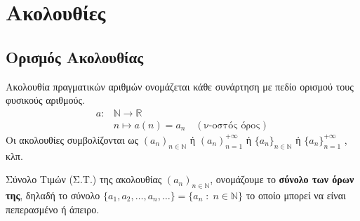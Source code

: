 \documentclass[a4paper,table]{report}
\begin{document}
\chapter{Ακολουθίες}

\section{Ορισμός Ακολουθίας}

\begin{mybox1}
  \begin{dfn}
    \textcolor{Col1}{Ακολουθία} πραγματικών αριθμών ονομάζεται 
    κάθε συνάρτηση με πεδίο ορισμού τους φυσικούς αριθμούς. 
    \begin{align*}
      a \colon &\mathbb{N} \to \mathbb{R} \\
               &n \mapsto a(n)=a_{n} \quad (\text{ν-οστός όρος})
    \end{align*} 
    Οι ακολουθίες συμβολίζονται ως $ (a_{n})_{n \in \mathbb{N}} $ 
    ή $ ( a_{n} ) _{n=1}^{+\infty}$  ή $ \{ a_{n} \} _{n \in \mathbb{N}} $ ή 
    $ \{ a_{n} \} _{n=1}^{+\infty}$ , κλπ.
  \end{dfn}
\end{mybox1}

\begin{mybox1}
  \begin{dfn}
    \textcolor{Col1}{Σύνολο Τιμών} (Σ.Τ.) της ακολουθίας 
    $ (a_{n})_{n \in \mathbb{N}} $, ονομάζουμε το \textbf{σύνολο των όρων της}, 
    δηλαδή το σύνολο $ \{ a_{1}, a_{2}, \ldots, a_{n}, \ldots \} = \{ a_{n} \; : \; n
    \in \mathbb{N} \} $ το οποίο μπορεί να είναι πεπερασμένο ή άπειρο.
  \end{dfn}
\end{mybox1}
\end{document}
